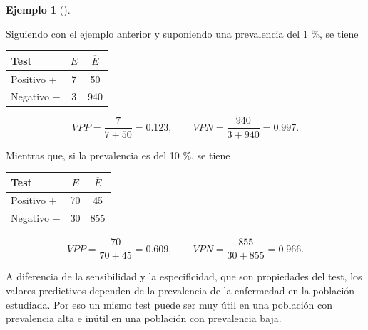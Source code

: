\documentclass[
  spanish,
  a4paper,
]{scrreport}
\newcounter{none} %
\theoremstyle{definition}
\theoremstyle{definition}
\newtheorem{example}{Ejemplo}[chapter]
\theoremstyle{remark}
\begin{document}
\begin{example}[]\protect\hypertarget{exm-valores-predictivos}{}\label{exm-valores-predictivos}

Siguiendo con el ejemplo anterior y suponiendo una prevalencia del 1 \%,
se tiene

{\def\LTcaptype{none} %
\begin{longtable}[]{@{}lcc@{}}
\toprule\noalign{}
Test & \(E\) & \(\overline{E}\) \\
\midrule\noalign{}
\endhead
\bottomrule\noalign{}
\endlastfoot
Positivo \(+\) & 7 & 50 \\
Negativo \(-\) & 3 & 940 \\
\end{longtable}
}

\[VPP = \frac{7}{7+50} = 0.123, \qquad VPN = \frac{940}{3+940} = 0.997.\]

Mientras que, si la prevalencia es del 10 \%, se tiene

{\def\LTcaptype{none} %
\begin{longtable}[]{@{}lcc@{}}
\toprule\noalign{}
Test & \(E\) & \(\overline{E}\) \\
\midrule\noalign{}
\endhead
\bottomrule\noalign{}
\endlastfoot
Positivo \(+\) & 70 & 45 \\
Negativo \(-\) & 30 & 855 \\
\end{longtable}
}

\[VPP = \frac{70}{70+45} = 0.609, \qquad VPN = \frac{855}{30+855} = 0.966.\]

\end{example}

\begin{tcolorbox}[enhanced jigsaw, arc=.35mm, bottomrule=.15mm, bottomtitle=1mm, breakable, colback=white, colbacktitle=quarto-callout-important-color!10!white, colframe=quarto-callout-important-color-frame, coltitle=black, left=2mm, leftrule=.75mm, opacityback=0, opacitybacktitle=0.6, rightrule=.15mm, title=\textcolor{quarto-callout-important-color}{\faExclamation}\hspace{0.5em}{Importante}, titlerule=0mm, toprule=.15mm, toptitle=1mm]

A diferencia de la sensibilidad y la especificidad, que son propiedades
del test, los valores predictivos dependen de la prevalencia de la
enfermedad en la población estudiada. Por eso un mismo test puede ser
muy útil en una población con prevalencia alta e inútil en una población
con prevalencia baja.

\end{tcolorbox}
\end{document}
